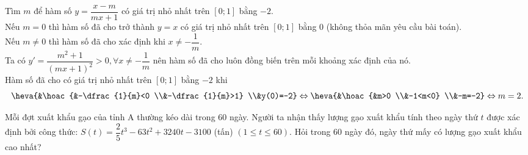 \begin{ex}%
 Tìm $m$ để hàm số $y=\dfrac{x-m}{mx+1}$ có giá trị nhỏ nhất trên $[0;1]$ bằng $-2$.\\
 \loigiai
 {
 Nếu $m=0$ thì hàm số đã cho trở thành $y=x$ có giá trị nhỏ nhất trên $[0;1]$ bằng $0$ (không thỏa mãn yêu cầu bài toán).\\
 Nếu $m \neq 0$ thì hàm số đã cho xác định khi $x\neq -\dfrac{1}{m}$.\\
 Ta có $y'=\dfrac{m^2+1}{(mx+1)^2}>0, \forall x \neq -\dfrac{1}{m}$ nên hàm số đã cho luôn đồng biến trên mỗi khoảng xác định của nó.\\
 Hàm số đã cho có giá trị nhỏ nhất trên $[0;1]$ bằng $-2$ khi
 \[\heva{&\hoac{&-\dfrac{1}{m}<0 \\&-\dfrac{1}{m}>1} \\&y(0)=-2} \Leftrightarrow \heva{&\hoac{&m>0 \\&-1<m<0} \\&-m=-2} \Leftrightarrow m=2.\]
 }
\end{ex}
\begin{ex}%
 Mỗi đợt xuất khẩu gạo của tỉnh A thường kéo dài trong $60$ ngày. Người ta nhận thấy lượng gạo xuất khẩu tính theo ngày thứ $t$ được xác định bởi công thức: $S(t)=\dfrac{2}{5}t^3-63t^2+3240t-3100$ (tấn) $(1 \le t \le 60)$. Hỏi trong $60$ ngày đó, ngày thứ mấy có lượng gạo xuất khẩu cao nhất?\\
\end{ex}
